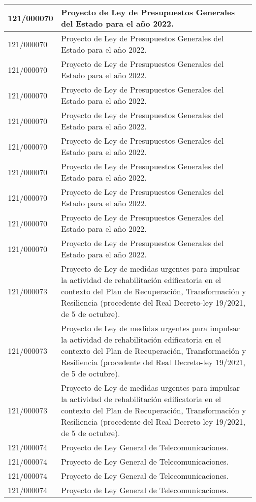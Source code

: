 {\begin{table}[H]
\begin{center}
\begin{tabularx}{\linewidth}{| l | X |}
\hline
121/000070 & Proyecto de Ley de Presupuestos Generales del Estado para el año 2022. \\
\hline
121/000070 & Proyecto de Ley de Presupuestos Generales del Estado para el año 2022. \\
\hline
121/000070 & Proyecto de Ley de Presupuestos Generales del Estado para el año 2022. \\
\hline
121/000070 & Proyecto de Ley de Presupuestos Generales del Estado para el año 2022. \\
\hline
121/000070 & Proyecto de Ley de Presupuestos Generales del Estado para el año 2022. \\
\hline
121/000070 & Proyecto de Ley de Presupuestos Generales del Estado para el año 2022. \\
\hline
121/000070 & Proyecto de Ley de Presupuestos Generales del Estado para el año 2022. \\
\hline
121/000070 & Proyecto de Ley de Presupuestos Generales del Estado para el año 2022. \\
\hline
121/000070 & Proyecto de Ley de Presupuestos Generales del Estado para el año 2022. \\
\hline
121/000070 & Proyecto de Ley de Presupuestos Generales del Estado para el año 2022. \\
\hline
121/000073 & Proyecto de Ley de medidas urgentes para impulsar la actividad de rehabilitación edificatoria en el contexto del Plan de Recuperación, Transformación y Resiliencia (procedente del Real Decreto-ley 19/2021, de 5 de octubre). \\
\hline
121/000073 & Proyecto de Ley de medidas urgentes para impulsar la actividad de rehabilitación edificatoria en el contexto del Plan de Recuperación, Transformación y Resiliencia (procedente del Real Decreto-ley 19/2021, de 5 de octubre). \\
\hline
121/000073 & Proyecto de Ley de medidas urgentes para impulsar la actividad de rehabilitación edificatoria en el contexto del Plan de Recuperación, Transformación y Resiliencia (procedente del Real Decreto-ley 19/2021, de 5 de octubre). \\
\hline
121/000074 & Proyecto de Ley General de Telecomunicaciones. \\
\hline
121/000074 & Proyecto de Ley General de Telecomunicaciones. \\
\hline
121/000074 & Proyecto de Ley General de Telecomunicaciones. \\
\hline
121/000074 & Proyecto de Ley General de Telecomunicaciones. \\

\end{tabularx}
\end{center}
\end{table}}
